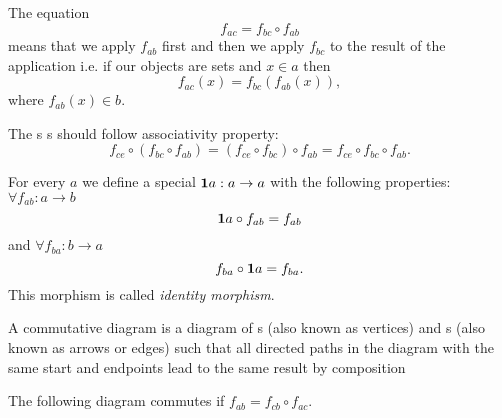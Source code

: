 \begin{remark}[Composition]
\label{rem:composition}
The equation
\[
f_{ac} = f_{bc} \circ f_{ab}
\]
means that we apply $f_{ab}$ first and then we apply $f_{bc}$ to the
result of the application i.e. if our objects are sets and $x \in a$
then 
\[
f_{ac} ( x ) = f_{bc} ( f_{ab} ( x ) ),
\]
where $f_{ab} ( x ) \in b$.
\end{remark}

\begin{property}[Associativity]
\label{prop:associativity}
The s s should
follow associativity property:
\[
f_{ce} \circ (f_{bc} \circ f_{ab}) = (f_{ce} \circ f_{bc}) \circ
f_{ab} = f_{ce} \circ f_{bc} \circ f_{ab}.
\]
\end{property}

\begin{definition}
\label{def:id}
For every  $a$ we define a special
 $\idarrow[a] : a \rightarrow a$ with the
following properties: $\forall f_{ab} : a \rightarrow b$
\[
\idarrow[a] \circ f_{ab} = f_{ab}
\]
and
$\forall f_{ba} : b \rightarrow a$
\[
f_{ba} \circ \idarrow[a]  = f_{ba}.
\] 
This morphism is called \textit{identity morphism}.
\end{definition}

\begin{definition}
  A commutative diagram is a diagram of s (also known as
  vertices) and s (also known as arrows or
  edges) such that all directed paths in the diagram with the same
  start and endpoints lead to the same result by composition
  \label{def:commutativediagram}

  The following diagram commutes if $f_{ab} = f_{cb} \circ f_{ac}$.

\end{definition}


